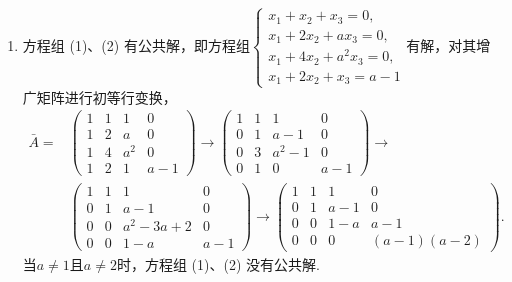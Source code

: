 \begin{enumerate}
    \item 方程组 (1)、(2) 有公共解，即方程组$\begin{cases}
                  x_1+x_2+x_3=0,     \\
                  x_1+2x_2+ax_3=0,   \\
                  x_1+4x_2+a^2x_3=0, \\
                  x_1+2x_2+x_3=a-1
              \end{cases}$有解，对其增广矩阵进行初等行变换，
          \begin{align*}
              \bar{A}= & \begin{pmatrix}
                             1 & 1 & 1   & 0   \\
                             1 & 2 & a   & 0   \\
                             1 & 4 & a^2 & 0   \\
                             1 & 2 & 1   & a-1
                         \end{pmatrix}\rightarrow
              \begin{pmatrix}
                  1 & 1 & 1     & 0   \\
                  0 & 1 & a-1   & 0   \\
                  0 & 3 & a^2-1 & 0   \\
                  0 & 1 & 0     & a-1
              \end{pmatrix}\rightarrow               \\
                       & \begin{pmatrix}
                             1 & 1 & 1        & 0   \\
                             0 & 1 & a-1      & 0   \\
                             0 & 0 & a^2-3a+2 & 0   \\
                             0 & 0 & 1-a      & a-1
                         \end{pmatrix}\rightarrow
              \begin{pmatrix}
                  1 & 1 & 1   & 0          \\
                  0 & 1 & a-1 & 0          \\
                  0 & 0 & 1-a & a-1        \\
                  0 & 0 & 0   & (a-1)(a-2)
              \end{pmatrix}.
          \end{align*}
          当$a\neq 1$且$a\neq 2$时，方程组 (1)、(2) 没有公共解.


\end{enumerate}
